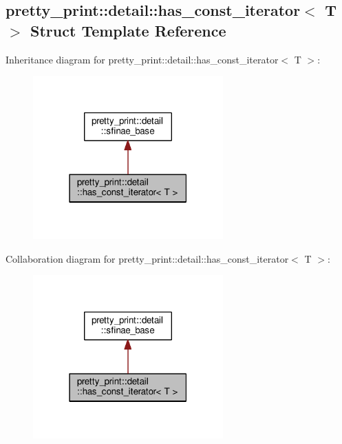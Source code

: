 \hypertarget{structpretty__print_1_1detail_1_1has__const__iterator}{}\subsection{pretty\+\_\+print\+:\+:detail\+:\+:has\+\_\+const\+\_\+iterator$<$ T $>$ Struct Template Reference}
\label{structpretty__print_1_1detail_1_1has__const__iterator}


Inheritance diagram for pretty\+\_\+print\+:\+:detail\+:\+:has\+\_\+const\+\_\+iterator$<$ T $>$\+:\nopagebreak
\begin{figure}[H]
\begin{center}
\leavevmode
\includegraphics[width=207pt]{structpretty__print_1_1detail_1_1has__const__iterator__inherit__graph}
\end{center}
\end{figure}


Collaboration diagram for pretty\+\_\+print\+:\+:detail\+:\+:has\+\_\+const\+\_\+iterator$<$ T $>$\+:\nopagebreak
\begin{figure}[H]
\begin{center}
\leavevmode
\includegraphics[width=207pt]{structpretty__print_1_1detail_1_1has__const__iterator__coll__graph}
\end{center}
\end{figure}

